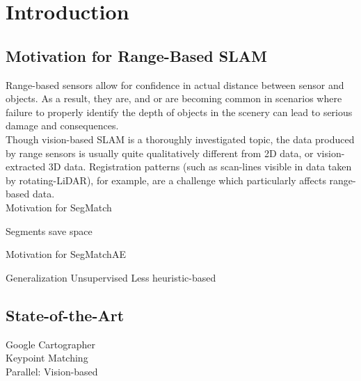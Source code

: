 \chapter{Introduction}
\label{sec:introduction}

\section{Motivation for Range-Based SLAM}
\label{sec:motivation}

Range-based sensors allow for confidence in actual distance between sensor and objects. As a result, they are, and or are becoming common in scenarios where failure to properly identify the depth of objects in the scenery can lead to serious damage and consequences.\\%

Though vision-based SLAM is a thoroughly investigated topic, the data produced by range sensors is usually quite qualitatively different from 2D data, or vision-extracted 3D data. Registration patterns (such as scan-lines visible in data taken by rotating-LiDAR), for example, are a challenge which particularly affects range-based data.\\

Motivation for SegMatch

Segments save space

Motivation for SegMatchAE

Generalization
Unsupervised
Less heuristic-based

\section{State-of-the-Art}
\label{sec:SOTA}

Google Cartographer\\
Keypoint Matching\\
Parallel: Vision-based\\

